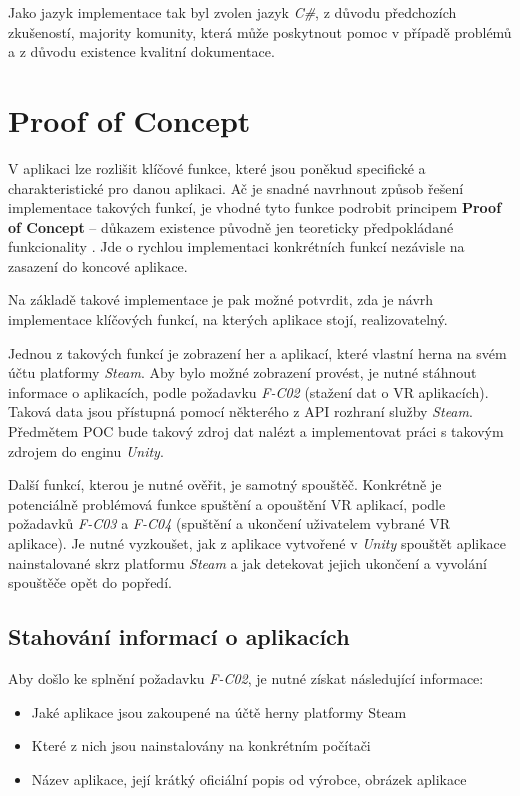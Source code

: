 Jako jazyk implementace tak byl zvolen jazyk \emph{C\#}, z důvodu
předchozích zkušeností, majority komunity, která může poskytnout pomoc v
případě problémů a z důvodu existence kvalitní dokumentace.

\section{Proof of Concept}\label{proof-of-concept}

V aplikaci lze rozlišit klíčové funkce, které jsou poněkud specifické a
charakteristické pro danou aplikaci. Ač je snadné navrhnout způsob
řešení implementace takových funkcí, je vhodné tyto funkce podrobit
principem \textbf{Proof of Concept} -- důkazem existence původně jen
teoreticky předpokládané funkcionality \autocite{proofofconcept}. Jde o rychlou implementaci
konkrétních funkcí nezávisle na zasazení do koncové aplikace.

Na základě takové implementace je pak možné potvrdit, zda je návrh
implementace klíčových funkcí, na kterých aplikace stojí,
realizovatelný.

Jednou z takových funkcí je zobrazení her a aplikací, které vlastní herna na svém
účtu platformy \emph{Steam}. Aby bylo možné zobrazení provést, je nutné
stáhnout informace o aplikacích, podle požadavku \emph{F-C02} (stažení dat o
VR aplikacích). Taková data jsou přístupná pomocí některého z API
rozhraní služby \emph{Steam}. Předmětem POC bude takový zdroj dat nalézt
a implementovat práci s takovým zdrojem do enginu \emph{Unity}.

Další funkcí, kterou je nutné ověřit, je samotný spouštěč. Konkrétně
je potenciálně problémová funkce spuštění a opouštění VR aplikací, podle
požadavků \emph{F-C03} a \emph{F-C04} (spuštění a ukončení uživatelem
vybrané VR aplikace). Je nutné vyzkoušet, jak z aplikace vytvořené v
\emph{Unity} spouštět aplikace nainstalované skrz platformu \emph{Steam}
a jak detekovat jejich ukončení a vyvolání spouštěče opět do popředí.

\subsection{Stahování informací o
aplikacích}\label{stahovuxe1nuxed-informacuxed-o-aplikacuxedch}

Aby došlo ke splnění požadavku \emph{F-C02}, je nutné získat následující
informace:

\begin{itemize}
\tightlist
\item
  Jaké aplikace jsou zakoupené na účtě herny platformy Steam
\item
  Které z nich jsou nainstalovány na konkrétním počítači
\item
  Název aplikace, její krátký oficiální popis od výrobce, obrázek
  aplikace
\end{itemize}

